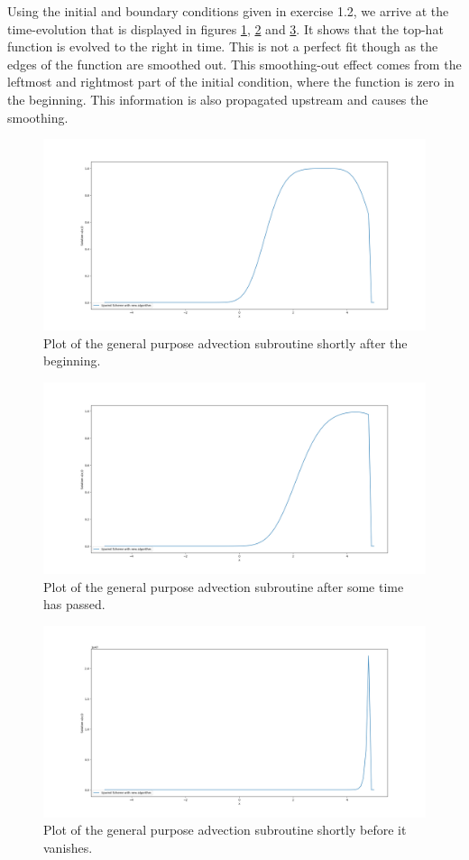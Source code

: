 \documentclass{scrartcl}
\begin{document}
Using the initial and boundary conditions given in exercise 1.2, we arrive at the time-evolution that is displayed in figures \ref{fig:upwindnewt1000}, \ref{fig:upwindnewt100} and \ref{fig:upwindnewt10}. It shows that the top-hat function is evolved to the right in time. This is not a perfect fit though as the edges of the function are smoothed out. This smoothing-out effect comes from the leftmost and rightmost part of the initial condition, where the function is zero in the beginning. This information is also propagated upstream and causes the smoothing.

\begin{figure}[H]
	\centering
	\includegraphics[width=1\linewidth]{Plots/upwind_new_t1000}
	\caption{Plot of  the general purpose advection subroutine shortly after the beginning.}
	\label{fig:upwindnewt1000}
\end{figure}

\begin{figure}[H]
	\centering
	\includegraphics[width=1\linewidth]{Plots/upwind_new_t100}
	\caption{Plot of  the general purpose advection subroutine after some time has passed.}
	\label{fig:upwindnewt100}
\end{figure}

\begin{figure}[H]
	\centering
	\includegraphics[width=1\linewidth]{Plots/upwind_new_t10}
	\caption{Plot of  the general purpose advection subroutine shortly before it vanishes.}
	\label{fig:upwindnewt10}
\end{figure}
\end{document}
